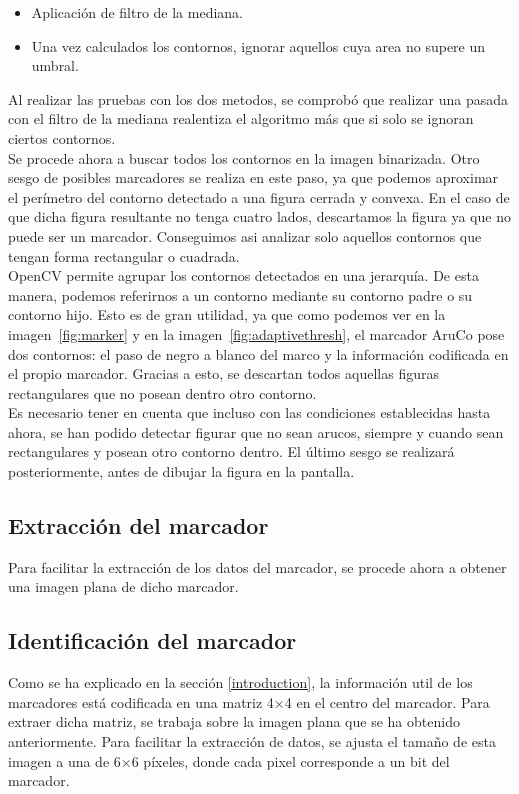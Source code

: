 \documentclass{article}
\begin{document}
\begin{itemize}
\item Aplicación de filtro de la mediana.
\item Una vez calculados los contornos, ignorar aquellos cuya area no supere un umbral.
\end{itemize}

Al realizar las pruebas con los dos metodos, se comprobó que realizar una pasada con el filtro de la mediana realentiza el algoritmo más que si solo se ignoran ciertos contornos.\\

Se procede ahora a buscar todos los contornos en la imagen binarizada. Otro sesgo de posibles marcadores se realiza en este paso, ya que podemos aproximar el perímetro del contorno detectado a una figura cerrada y convexa. En el caso de que dicha figura resultante no tenga cuatro lados, descartamos la figura ya que no puede ser un marcador. Conseguimos asi analizar solo aquellos contornos que tengan forma rectangular o cuadrada.\\
OpenCV permite agrupar los contornos detectados en una jerarquía. De esta manera, podemos referirnos a un contorno mediante su contorno padre o su contorno hijo.
Esto es de gran utilidad, ya que como podemos ver en la imagen~\ref{fig:marker} y en la imagen~\ref{fig:adaptivethresh}, el marcador AruCo pose dos contornos: el paso de negro a blanco del marco y la información codificada en el propio marcador. Gracias a esto, se descartan todos aquellas figuras rectangulares que no posean dentro otro contorno.\\
Es necesario tener en cuenta que incluso con las condiciones establecidas hasta ahora, se han podido detectar figurar que no sean arucos, siempre y cuando sean rectangulares y posean otro contorno dentro. El último sesgo se realizará posteriormente, antes de dibujar la figura en la pantalla.\\

\subsection{Extracción del marcador}
Para facilitar la extracción de los datos del marcador, se procede ahora a obtener una imagen plana de dicho marcador.


\subsection{Identificación del marcador}
Como se ha explicado en la sección \ref{introduction}, la información util de los marcadores está codificada en una matriz 4$\times$4 en el centro del marcador.
Para extraer dicha matriz, se trabaja sobre la imagen plana que se ha obtenido anteriormente. Para facilitar la extracción de datos, se ajusta el tamaño de esta imagen a una de 6$\times$6 píxeles, donde cada pixel corresponde a un bit del marcador.\\
\end{document}
